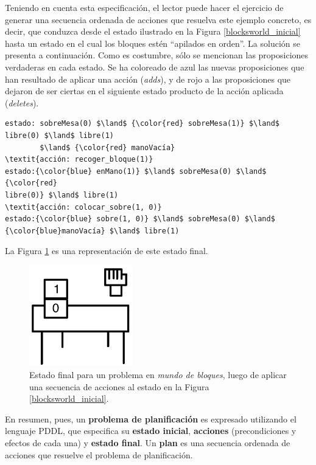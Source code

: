 Teniendo en cuenta esta especificación, el lector puede hacer el ejercicio de
generar una secuencia ordenada de acciones que resuelva este ejemplo
concreto, es decir, que conduzca desde el estado ilustrado en la Figura
\ref{blocksworld_inicial} hasta un estado en el cual los bloques estén ``apilados en
orden''. La solución se presenta a continuación. Como es costumbre, sólo se
mencionan las proposiciones verdaderas en cada estado. Se ha coloreado de azul
las nuevas proposiciones que han resultado de aplicar una acción
(\textit{adds}), y de rojo a las proposiciones que dejaron de ser ciertas en el
siguiente estado producto de la acción aplicada (\textit{deletes}).
\begin{Verbatim}[commandchars=\\\{\},
codes={\catcode`$=3\catcode`^=7}]
estado: sobreMesa(0) $\land$ {\color{red} sobreMesa(1)} $\land$ libre(0) $\land$ libre(1)
        $\land$ {\color{red} manoVacía}
\textit{acción: recoger_bloque(1)}
estado:{\color{blue} enMano(1)} $\land$ sobreMesa(0) $\land$ {\color{red}
libre(0)} $\land$ libre(1)
\textit{acción: colocar_sobre(1, 0)}
estado:{\color{blue} sobre(1, 0)} $\land$ sobreMesa(0) $\land$ {\color{blue}manoVacía} $\land$ libre(1)
\end{Verbatim}

La Figura \ref{blocksworld_final} es una representación de este estado final.

\begin{figure}[h!]
\centering
\includegraphics[width=0.4\textwidth]{figuras/blocksworld_final.png}
\caption{Estado final para un problema en \textit{mundo de bloques},
luego de aplicar una secuencia de acciones al estado en la Figura \ref{blocksworld_inicial}.}
\label{blocksworld_final}
\end{figure}

En resumen, pues, un \textbf{problema de planificación} es expresado utilizando
el lenguaje PDDL, que especifica su \textbf{estado inicial}, \textbf{acciones}
(precondiciones y efectos de cada una) y \textbf{estado final}.
Un \textbf{plan} es una secuencia ordenada de acciones que resuelve el problema
de planificación.

